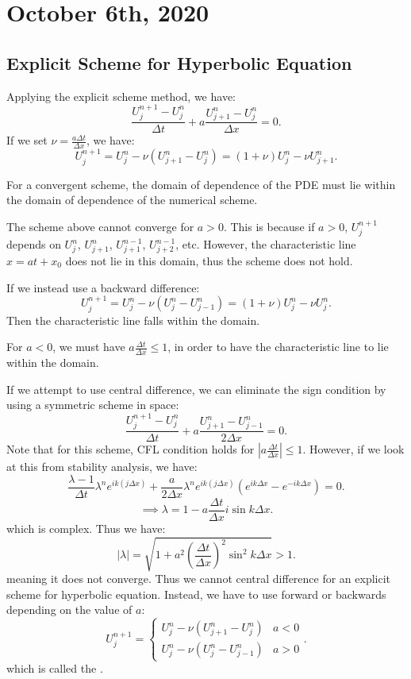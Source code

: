 \documentclass[../main/main.tex]{subfiles}
\begin{document}
\section{October  6th, 2020}
\subsection{Explicit Scheme for Hyperbolic Equation}
Applying the explicit scheme method, we have: \[
    \frac{U_{j}^{n+1}-U_j^n}{\Delta t} + a \frac{U_{j+1}^n - U_j^n}{\Delta x } = 0
.\] If we set $\nu = \frac{a \Delta t}{\Delta x}$, we have: \[
U^{n+1}_j = U^n_j - \nu (U_{j+1}^n - U_j^n) = (1+\nu) U_j^n - \nu U_{j+1}^n
.\] 
\begin{definition}
   For a convergent scheme, the domain of dependence of the PDE must lie within the domain of dependence of the numerical scheme. 
\end{definition}
\begin{example}
    The scheme above cannot converge for $a>0$. This is because if $a>0$, $U_j^{n+1}$ depends on  $U_j^n$,  $U_{j+1}^n$, $U_{j+1}^{n-1}$, $U_{j+2}^{n-1}$, etc. However, the characteristic line $x = at + x_0$ does not lie in this domain, thus the scheme does not hold.
\end{example}
\begin{example}
   If we instead use a backward difference: \[ 
       U^{n+1}_j = U^n_j - \nu (U_{j}^n - U_{j-1}^n) = (1+\nu) U_j^n - \nu U_{j}^n
   .\]  Then the characteristic line falls within the domain.
\end{example}
\begin{example}
    For $a < 0$, we must have $a \frac{\Delta t}{\Delta x}\le 1$, in order to have the characteristic line to lie within the domain.
\end{example}
If we attempt to use central difference, we can eliminate the sign condition by using a symmetric scheme in space: \[
    \frac{U_j^{n+1}-U_j^n}{\Delta t} + a \frac{U_{j+1}^n - U_{j-1}^n}{2\Delta x} = 0
.\] Note that for this scheme, CFL condition holds for $|a \frac{\Delta t}{\Delta x}| \le  1$. However, if we look at this from stability analysis, we have: \[
\frac{\lambda-1}{\Delta t} \lambda^n e^{ik(j\Delta x)} + \frac{a}{2\Delta x} \lambda^n e^{ik(j\Delta x)}\left( e^{ik\Delta x} - e ^{-ik\Delta x} \right) =0
.\] \[
 \implies \lambda = 1 - a \frac{\Delta t}{\Delta x} i \sin k\Delta x 
.\]which is complex. Thus we have: \[
|\lambda| = \sqrt{1+a^2\left( \frac{\Delta t}{\Delta x} \right)^2 \sin^2 k\Delta x }> 1 
.\] meaning it does not converge. Thus we cannot central difference for an explicit scheme for hyperbolic equation. Instead, we have to use forward or backwards depending on the value of $a$: \[
U^{n+1}_j = \begin{cases}
    U_j^n - \nu (U_{j+1}^n - U_j^n) & a < 0 \\
    U_j^n - \nu(U_j^n - U_{j-1}^n) & a > 0
\end{cases}
.\] which is called the .
\end{document}
